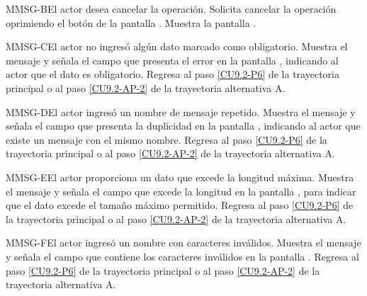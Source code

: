 	\begin{UCtrayectoriaA}{MMSG-B}{El actor desea cancelar la operación.}
		\UCpaso[\UCactor] Solicita cancelar la operación oprimiendo el botón  de la pantalla .
		\UCpaso[\UCsist] Muestra la pantalla .
	\end{UCtrayectoriaA}

	\begin{UCtrayectoriaA}{MMSG-C}{El actor no ingresó algún dato marcado como obligatorio.}
		\UCpaso[\UCsist] Muestra el mensaje  y señala el campo que presenta el error en la pantalla , indicando al actor que el dato es obligatorio.
		\UCpaso Regresa al paso \ref{CU9.2-P6} de la trayectoria principal o al paso \ref{CU9.2-AP-2} de la trayectoria alternativa A.
	\end{UCtrayectoriaA}
	
	\begin{UCtrayectoriaA}{MMSG-D}{El actor ingresó un nombre de mensaje repetido.}
		\UCpaso[\UCsist] Muestra el mensaje  y señala el campo que presenta la duplicidad en la pantalla , indicando al actor que existe un mensaje con el mismo nombre.
		\UCpaso Regresa al paso \ref{CU9.2-P6} de la trayectoria principal o al paso \ref{CU9.2-AP-2} de la trayectoria alternativa A.
	\end{UCtrayectoriaA}

	\begin{UCtrayectoriaA}{MMSG-E}{El actor proporciona un dato que excede la longitud máxima.}
		\UCpaso[\UCsist] Muestra el mensaje  y señala el campo que excede la longitud en la pantalla , para indicar que el dato excede el tamaño máximo permitido.
		\UCpaso Regresa al paso \ref{CU9.2-P6} de la trayectoria principal o al paso \ref{CU9.2-AP-2} de la trayectoria alternativa A.
	\end{UCtrayectoriaA}

	\begin{UCtrayectoriaA}{MMSG-F}{El actor ingresó un nombre con caracteres inválidos.}
	\UCpaso[\UCsist] Muestra el mensaje  y señala el campo que contiene los caracteres inválidos en la pantalla .
	\UCpaso Regresa al paso \ref{CU9.2-P6} de la trayectoria principal o al paso \ref{CU9.2-AP-2} de la trayectoria alternativa A.
	\end{UCtrayectoriaA}

